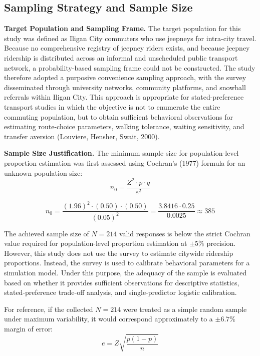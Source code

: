 {\subsection{Sampling Strategy and Sample Size}
\label{subsec:3.1.3 sampling strategy and sample size}
\indent\textbf{Target Population and Sampling Frame.} The target population for this study was defined as Iligan City commuters who use jeepneys for intra-city travel. Because no comprehensive registry of jeepney riders exists, and because jeepney ridership is distributed across an informal and unscheduled public transport network, a probability-based sampling frame could not be constructed. The study therefore adopted a purposive convenience sampling approach, with the survey disseminated through university networks, community platforms, and snowball referrals within Iligan City. This approach is appropriate for stated-preference transport studies in which the objective is not to enumerate the entire commuting population, but to obtain sufficient behavioral observations for estimating route-choice parameters, walking tolerance, waiting sensitivity, and transfer aversion (Louviere, Hensher, Swait, 2000).

\indent\textbf{Sample Size Justification.} The minimum sample size for population-level proportion estimation was first assessed using Cochran’s (1977) formula for an unknown population size:
\[
n_0 = \frac{Z^2 \cdot p \cdot q}{e^2}
\]

\[
n_0 = \frac{(1.96)^2 \cdot (0.50) \cdot (0.50)}{(0.05)^2}
= \frac{3.8416 \cdot 0.25}{0.0025}
\approx 385
\]

\indent
The achieved sample size of \(N = 214\) valid responses is below the strict Cochran value required for population-level proportion estimation at \(\pm 5\%\) precision. However, this study does not use the survey to estimate citywide ridership proportions. Instead, the survey is used to calibrate behavioral parameters for a simulation model. Under this purpose, the adequacy of the sample is evaluated based on whether it provides sufficient observations for descriptive statistics, stated-preference trade-off analysis, and single-predictor logistic calibration.

For reference, if the collected \(N = 214\) were treated as a simple random sample under maximum variability, it would correspond approximately to a \(\pm 6.7\%\) margin of error:
\[
e = Z \sqrt{\frac{p(1-p)}{n}}
\]

}
